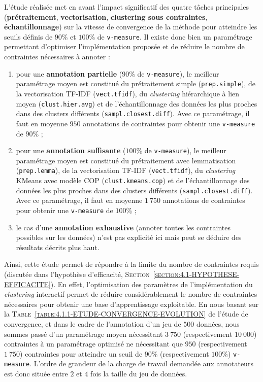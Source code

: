 			L'étude réalisée met en avant l'impact significatif des quatre tâches principales (\textbf{prétraitement}, \textbf{vectorisation}, \textbf{clustering sous contraintes}, \textbf{échantillonnage}) sur la vitesse de convergence de la méthode pour atteindre les seuils définis de $90$\% et $100$\% de \texttt{v-measure}. Il existe donc bien un paramétrage permettant d'optimiser l'implémentation proposée et de réduire le nombre de contraintes nécessaires à annoter :
			\begin{enumerate}
				\item pour une \textbf{annotation partielle} ($90$\% de \texttt{v-measure}), le meilleur paramétrage moyen est constitué du prétraitement simple (\texttt{prep.simple}), de la vectorisation TF-IDF (\texttt{vect.tfidf}), du \textit{clustering} hiérarchique à lien moyen (\texttt{clust.hier.avg}) et de l'échantillonnage des données les plus proches dans des clusters différents (\texttt{sampl.closest.diff}). Avec ce paramétrage, il faut en moyenne $950$ annotations de contraintes pour obtenir une \texttt{v-measure} de $90$\% ;
				\item pour une \textbf{annotation suffisante} ($100$\% de \texttt{v-measure}), le meilleur paramétrage moyen est constitué du prétraitement avec lemmatisation (\texttt{prep.lemma}), de la vectorisation TF-IDF (\texttt{vect.tfidf}), du \textit{clustering} KMeans avec modèle COP (\texttt{clust.kmeans.cop}) et de l'échantillonnage des données les plus proches dans des clusters différents (\texttt{sampl.closest.diff}). Avec ce paramétrage, il faut en moyenne $1~750$ annotations de contraintes pour obtenir une \texttt{v-measure} de $100$\% ;
				\item le cas d'une \textbf{annotation exhaustive} (annoter toutes les contraintes possibles sur les données) n'est pas explicité ici mais peut se déduire des résultats décrits plus haut.
			\end{enumerate}
			

			Ainsi, cette étude permet de répondre à la limite du nombre de contraintes requis (discutée dans l'hypothèse d'efficacité, \textsc{Section~\ref{section:4.1-HYPOTHESE-EFFICACITE}}).
			En effet, l'optimisation des paramètres de l'implémentation du \textit{clustering} interactif permet de réduire considérablement le nombre de contraintes nécessaires pour obtenir une base d'apprentissage exploitable.
			En nous basant sur la \textsc{Table~\ref{table:4.1.1-ETUDE-CONVERGENCE-EVOLUTION}} de l'étude de convergence, et dans le cadre de l'annotation d'un jeu de $500$ données, nous sommes passé d'un paramétrage moyen nécessitant $3~750$ (respectivement $10~000$) contraintes à un paramétrage optimisé ne nécessitant que $950$ (respectivement $1~750$) contraintes pour atteindre un seuil de $90$\% (respectivement $100$\%) \texttt{v-measure}.
			L'ordre de grandeur de la charge de travail demandée aux annotateurs est donc située entre $2$ et $4$ fois la taille du jeu de données.
			
